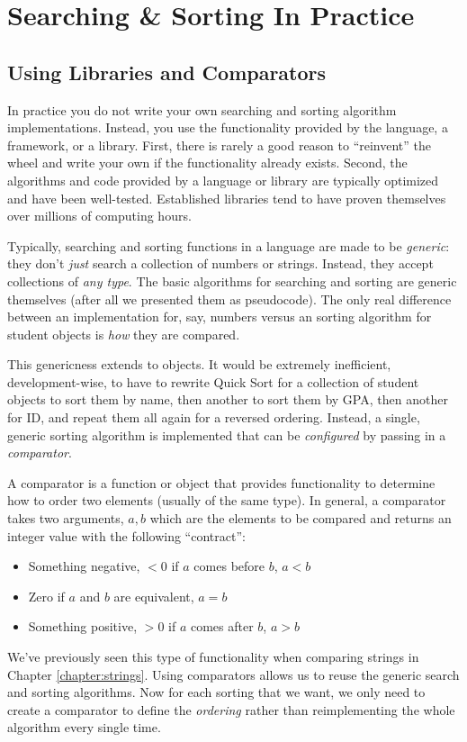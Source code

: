 \section{Searching \& Sorting In Practice}

\subsection{Using Libraries and Comparators}

In practice you do not write your own searching and sorting
algorithm implementations.  Instead, you use the functionality provided
by the language, a framework, or a library.  First, there is rarely a
good reason to ``reinvent'' the wheel and write your own if the functionality
already exists.  Second, the algorithms and code provided by a language
or library are typically optimized and have been well-tested.  Established
libraries tend to have proven themselves over millions of computing hours.

Typically, searching and sorting functions in a language are made to
be \emph{generic}: they don't \emph{just} search a collection of numbers
or strings.  Instead, they accept collections of \emph{any type}.  The
basic algorithms for searching and sorting are generic themselves (after
all we presented them as pseudocode).  The only real difference between
an implementation for, say, numbers versus an sorting algorithm for 
student objects is \emph{how} they are compared.  

This genericness extends to objects.  It would be extremely inefficient, 
development-wise, to have to rewrite Quick Sort for a collection of 
student objects to sort them by name, then another to sort them by GPA, 
then another for ID, and repeat them all again for a reversed ordering.
Instead, a single, generic sorting algorithm is implemented that can
be \emph{configured} by passing in a \emph{comparator}.

A comparator is a function or object that provides functionality to determine
how to order two elements (usually of the same type).  In general, a
comparator takes two arguments, $a, b$ which are the elements to be 
compared and returns an integer value with the following ``contract'':
\begin{itemize}
  \item Something negative, $< 0$ if $a$ comes before $b$, $a < b$
  \item Zero if $a$ and $b$ are equivalent, $a = b$
  \item Something positive, $> 0$ if $a$ comes after $b$, $a > b$
\end{itemize}
We've previously seen this type of functionality when comparing strings in
Chapter \ref{chapter:strings}.  Using comparators allows us to reuse
the generic search and sorting algorithms.  Now for each sorting that
we want, we only need to create a comparator to define the \emph{ordering}
rather than reimplementing the whole algorithm every single time.

